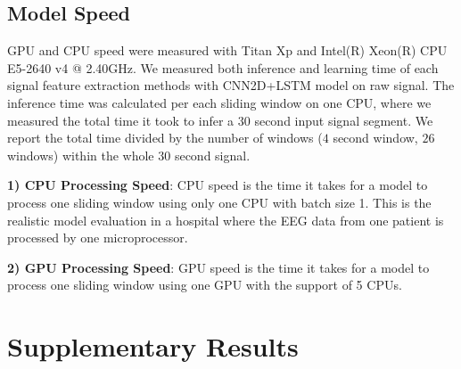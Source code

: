 \documentclass[pmlr,twocolumn,10pt]{jmlr}
\begin{document}
\subsection{Model Speed}
\label{sec: speed}
GPU and CPU speed were measured with Titan Xp and Intel(R) Xeon(R) CPU E5-2640 v4 @ 2.40GHz. We measured both inference and learning time of each signal feature extraction methods with CNN2D+LSTM model on raw signal. The inference time was calculated per each sliding window on one CPU, where we measured the total time it took to infer a $30$ second input signal segment. We report the total time divided by the number of windows ($4$ second window, $26$ windows) within the whole $30$ second signal. 

\noindent\textbf{1) CPU Processing Speed}: CPU speed is the time it takes for a model to process one sliding window using only one CPU with batch size 1. This is the realistic model evaluation in a hospital where the EEG data from one patient is processed by one microprocessor.

\noindent\textbf{2) GPU Processing Speed}: GPU speed is the time it takes for a model to process one sliding window using one GPU with the support of 5 CPUs.

\section{Supplementary Results}
\end{document}
